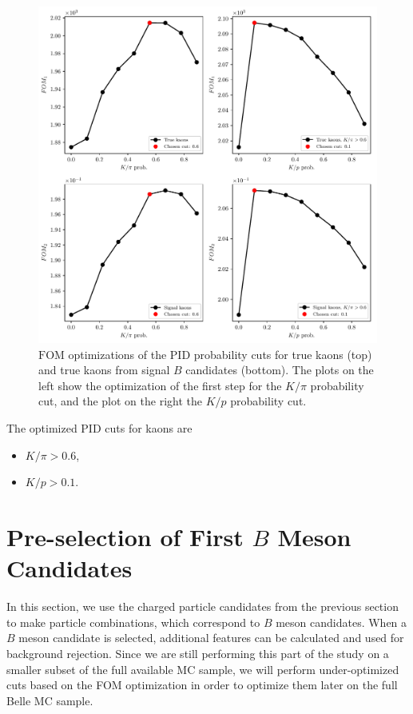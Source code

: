 \begin{figure}[!htb]
	\centering
	\captionsetup{width=.8\linewidth}
	\includegraphics[width=\linewidth]{fig/FSP_kaon_fom}
	\caption{$\mathrm{FOM}$ optimizations of the PID probability cuts for true kaons (top) and true kaons from signal $B$ candidates (bottom). The plots on the left show the optimization of the first step for the $K / \pi$ probability cut, and the plot on the right the $K/p$ probability cut.}
	\label{fig:Kfom}
\end{figure}

The optimized PID cuts for kaons are
\begin{itemize}
	\item $K/\pi > 0.6$,
	\item $K/p > 0.1$.
\end{itemize}

\section{Pre-selection of First $B$ Meson Candidates}

In this section, we use the charged particle candidates from the previous section to make particle combinations, which correspond to $B$ meson candidates. When a $B$ meson candidate is selected, additional features can be calculated and used for background rejection. Since we are still performing this part of the study on a smaller subset of the full available MC sample, we will perform under-optimized cuts based on the FOM optimization in order to optimize them later on the full Belle MC sample.

